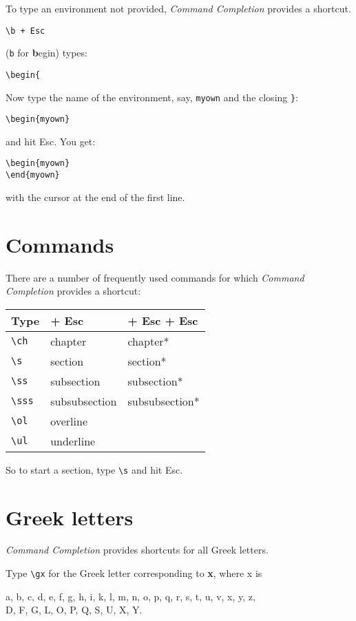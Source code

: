\documentclass[letterpaper,11pt]{article}
\newcommand{\cmd}[1]{\textsf{#1}}
\begin{document}
To type an environment not provided, \emph{Command Completion} provides a shortcut.
\begin{verbatim}
\b + Esc
\end{verbatim}
(\verb|b| for \textbf{b}egin) types:
\begin{verbatim}
\begin{
\end{verbatim}
Now type the name of the environment, say, \verb|myown| and the closing \texttt{\}}:
\begin{verbatim}
\begin{myown}
\end{verbatim}
and hit \cmd{Esc}. You get:
\begin{verbatim}
\begin{myown}
\end{myown}
\end{verbatim}
with the cursor at the end of the first line.

\newpage

\section{Commands}
There are a number of frequently used commands for which 
\emph{Command Completion} provides a shortcut:
\begin{center}
\begin{tabular}{l|l|l}
Type & + \cmd{Esc} & + \cmd{Esc} + \cmd{Esc} \\\hline
\verb|\ch| & chapter&chapter*\\
\verb|\s| & section & section*\\
\verb|\ss| & subsection & subsection*\\
\verb|\sss| & subsubsection & subsubsection*\\
\verb|\ol|&overline\\
\verb|\ul| & underline
\end{tabular}
\end{center}
So to start a section, type \verb|\s| and hit \cmd{Esc}.

\section{Greek letters}
\emph{Command Completion} provides shortcuts for all Greek letters.

Type \verb|\gx| for the Greek letter corresponding to \textbf{x}, where 
x is

\smallskip

\noindent a, b, c, d, e, f, g, h, i, k, l, m, n, o, p, q, r, s, t, u, v, x, y, z,\\
D, F, G, L, O, P, Q, S, U, X, Y.
\end{document}
